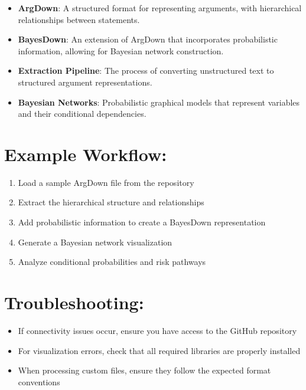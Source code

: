 \documentclass[
  11pt,
  letterpaper,
]{book}
\providecommand{\tightlist}{%
  \setlength{\itemsep}{0pt}\setlength{\parskip}{0pt}}
\begin{document}
\begin{itemize}
\tightlist
\item
  \textbf{ArgDown}: A structured format for representing arguments, with
  hierarchical relationships between statements.
\item
  \textbf{BayesDown}: An extension of ArgDown that incorporates
  probabilistic information, allowing for Bayesian network construction.
\item
  \textbf{Extraction Pipeline}: The process of converting unstructured
  text to structured argument representations.
\item
  \textbf{Bayesian Networks}: Probabilistic graphical models that
  represent variables and their conditional dependencies.
\end{itemize}

\section{Example Workflow:}\label{example-workflow}

\begin{enumerate}
\def\labelenumi{\arabic{enumi}.}
\tightlist
\item
  Load a sample ArgDown file from the repository
\item
  Extract the hierarchical structure and relationships
\item
  Add probabilistic information to create a BayesDown representation
\item
  Generate a Bayesian network visualization
\item
  Analyze conditional probabilities and risk pathways
\end{enumerate}

\section{Troubleshooting:}\label{troubleshooting-1}

\begin{itemize}
\tightlist
\item
  If connectivity issues occur, ensure you have access to the GitHub
  repository
\item
  For visualization errors, check that all required libraries are
  properly installed
\item
  When processing custom files, ensure they follow the expected format
  conventions
\end{itemize}
\end{document}
